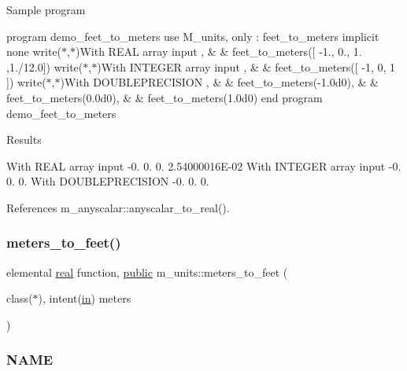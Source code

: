 Sample program

program demo\+\_\+feet\+\_\+to\+\_\+meters use M\+\_\+units, only \+: feet\+\_\+to\+\_\+meters implicit none write($\ast$,$\ast$)\textquotesingle{}With R\+E\+AL array input \textquotesingle{}, \& \& feet\+\_\+to\+\_\+meters(\mbox{[} -\/1., 0., 1. ,1./12.0\mbox{]}) write($\ast$,$\ast$)\textquotesingle{}With I\+N\+T\+E\+G\+ER array input \textquotesingle{}, \& \& feet\+\_\+to\+\_\+meters(\mbox{[} -\/1, 0, 1 \mbox{]}) write($\ast$,$\ast$)\textquotesingle{}With D\+O\+U\+B\+L\+E\+P\+R\+E\+C\+I\+S\+I\+ON \textquotesingle{}, \& \& feet\+\_\+to\+\_\+meters(-\/1.\+0d0), \& \& feet\+\_\+to\+\_\+meters(0.\+0d0), \& \& feet\+\_\+to\+\_\+meters(1.\+0d0) end program demo\+\_\+feet\+\_\+to\+\_\+meters

Results

With R\+E\+AL array input -\/0. 0. 0. 2.\+54000016E-\/02 With I\+N\+T\+E\+G\+ER array input -\/0. 0. 0. With D\+O\+U\+B\+L\+E\+P\+R\+E\+C\+I\+S\+I\+ON -\/0. 0. 0. 

References m\+\_\+anyscalar\+::anyscalar\+\_\+to\+\_\+real().

\mbox{\label{namespacem__units_a0ac5ab49814761420953eb6b859c80fd}} 
\subsubsection{\texorpdfstring{meters\+\_\+to\+\_\+feet()}{meters\_to\_feet()}}
{\footnotesize\ttfamily elemental \hyperlink{read__watch_83_8txt_abdb62bde002f38ef75f810d3a905a823}{real} function, \hyperlink{M__stopwatch_83_8txt_a2f74811300c361e53b430611a7d1769f}{public} m\+\_\+units\+::meters\+\_\+to\+\_\+feet (\begin{DoxyParamCaption}\item[{class($\ast$), intent(\hyperlink{M__journal_83_8txt_afce72651d1eed785a2132bee863b2f38}{in})}]{meters }\end{DoxyParamCaption})}



\subsubsection*{N\+A\+ME}


